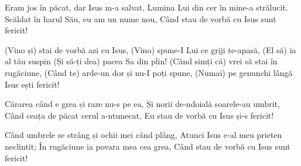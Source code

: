 \beginverse
Eram jos în păcat, dar Isus m-a salvat,
Lumina Lui din cer în mine-a strălucit.
Scăldat în harul Său, eu am un nume nou,
Când stau de vorbă cu Isus sunt fericit!
\endverse

\beginchorus
(Vino și) stai de vorbă azi cu Isus,
(Vino) spune-I Lui ce griji te-apasă,
(El să) ia al tău suspin
(Și să-ți dea) pacea Sa din plin!
(Când simți că) vrei să stai în rugăciune,
(Când te) arde-un dor și nu-I poți spune,
(Numai) pe genunchi lângă Isus ești fericit!
\endchorus

\beginverse
Cărarea când e grea și raze nu-s pe ea,
Și norii de-ndoială soarele-au umbrit,
Când ceața de păcat cerul a-ntunecat,
Eu stau de vorbă cu Isus și-s fericit!
\endverse

\beginverse
Când umbrele se strâng și ochii mei când plâng,
Atunci Isus e-al meu prieten neclintit;
În rugăciune ia povara mea cea grea,
Când stau de vorbă cu Isus sunt fericit!
\endverse
\endsong